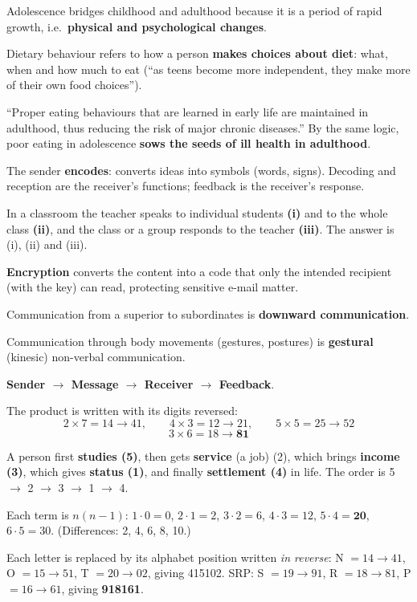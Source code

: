 Adolescence bridges childhood and adulthood because it is a period of rapid growth, i.e.\ \textbf{physical and psychological changes}.

Dietary behaviour refers to how a person \textbf{makes choices about diet}: what, when and how much to eat (``as teens become more independent, they make more of their own food choices'').

``Proper eating behaviours that are learned in early life are maintained in adulthood, thus reducing the risk of major chronic diseases.'' By the same logic, poor eating in adolescence \textbf{sows the seeds of ill health in adulthood}.

The sender \textbf{encodes}: converts ideas into symbols (words, signs). Decoding and reception are the receiver's functions; feedback is the receiver's response.

In a classroom the teacher speaks to individual students \textbf{(i)} and to the whole class \textbf{(ii)}, and the class or a group responds to the teacher \textbf{(iii)}. The answer is (i), (ii) and (iii).

\textbf{Encryption} converts the content into a code that only the intended recipient (with the key) can read, protecting sensitive e-mail matter.

Communication from a superior to subordinates is \textbf{downward communication}.

Communication through body movements (gestures, postures) is \textbf{gestural} (kinesic) non-verbal communication.

\textbf{Sender $\rightarrow$ Message $\rightarrow$ Receiver $\rightarrow$ Feedback}.

The product is written with its digits reversed:
\[2\times7=14\rightarrow41,\qquad4\times3=12\rightarrow21,\qquad5\times5=25\rightarrow52\]
\[3\times6=18\rightarrow\mathbf{81}\]

A person first \textbf{studies (5)}, then gets \textbf{service} (a job) (2), which brings \textbf{income (3)}, which gives \textbf{status (1)}, and finally \textbf{settlement (4)} in life. The order is 5 $\rightarrow$ 2 $\rightarrow$ 3 $\rightarrow$ 1 $\rightarrow$ 4.

Each term is $n(n-1)$: $1\cdot0=0$, $2\cdot1=2$, $3\cdot2=6$, $4\cdot3=12$, $5\cdot4=\mathbf{20}$, $6\cdot5=30$. (Differences: 2, 4, 6, 8, 10.)

Each letter is replaced by its alphabet position written \emph{in reverse}: N $=14\rightarrow41$, O $=15\rightarrow51$, T $=20\rightarrow02$, giving 415102.
SRP: S $=19\rightarrow91$, R $=18\rightarrow81$, P $=16\rightarrow61$, giving \textbf{918161}.

